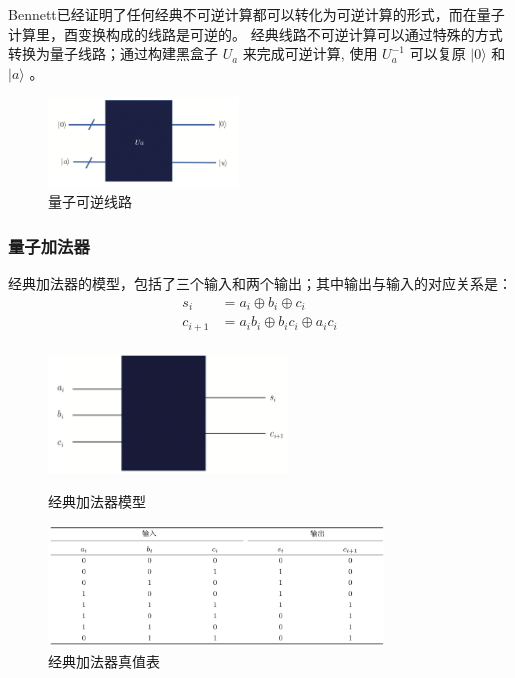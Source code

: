 \documentclass[12pt,hyperref,a4paper,UTF8]{ctexart}
\begin{document}
Bennett已经证明了任何经典不可逆计算都可以转化为可逆计算的形式，而在量子计算里，酉变换构成的线路是可逆的。
经典线路不可逆计算可以通过特殊的方式转换为量子线路；通过构建黑盒子 $U_a$ 来完成可逆计算, 使用 $U_a^{-1}$ 可以复原 $|0\rangle$ 和 $|a\rangle$ 。

\begin{figure}[!htbp]
    \centering
    \includegraphics[width =0.45\textwidth]{figures/量子可逆线路.png}
    \caption{量子可逆线路}
\end{figure}

\subsubsection{量子加法器}
经典加法器的模型，包括了三个输入和两个输出；其中输出与输入的对应关系是：
$$
\begin{aligned}
s_i&=a_i \oplus b_i \oplus c_i \\
c_{i+1}&=a_i b_i \oplus b_i c_i \oplus a_i c_i\\
\end{aligned}
$$
\begin{figure}[!htbp]
	\begin{minipage}{0.3\linewidth}
		\centering
		\includegraphics[width=2.5in]{figures/经典加法器模型.png}
		\caption{经典加法器模型}
	\end{minipage}
	\begin{minipage}{0.75\linewidth}
		\centering
		\includegraphics[width=3.5in]{figures/经典加法器真值表.png}
		\caption{经典加法器真值表}
	\end{minipage}
\end{figure}
\end{document}

